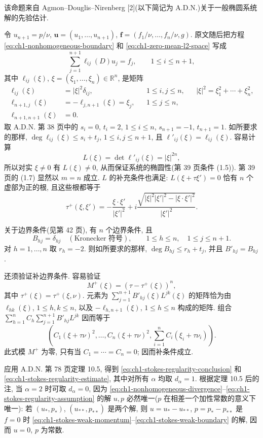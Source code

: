 \begin{Proof}
该命题来自 Agmon--Douglis--Nirenberg [2](以下简记为 A.D.N.)关于一般椭圆系统解的先验估计.

令 $u_{n+1}=p/\nu$, $\boldsymbol u=(u_1,\ldots,u_{n+1})$, $\boldsymbol f=(f_1/\nu,\ldots,f_n/\nu,g)$. 原文随后把方程 \eqref{eq:ch1-nonhomogeneous-boundary} 和 \eqref{eq:ch1-zero-mean-l2-space} 写成
\begin{equation}
\sum_{j=1}^{n+1}\ell_{ij}(D)u_j=f_j,
\qquad 1\leq i\leq n+1,
\label{eq:ch1-adn-system}
\end{equation}
其中 $\ell_{ij}(\xi)$, $\xi=(\xi_1,\ldots,\xi_n)\in\mathbb R^n$, 是矩阵
\begin{equation}
\begin{aligned}
\ell_{ij}(\xi)&=|\xi|^2\delta_{ij},
&&1\leq i,j\leq n,
&&|\xi|^2=\xi_1^2+\cdots+\xi_n^2,\\
\ell_{n+1,j}(\xi)&=-\ell_{j,n+1}(\xi)=\xi_j,
&&1\leq j\leq n,\\
\ell_{n+1,n+1}(\xi)&=0.
\end{aligned}
\label{eq:ch1-adn-symbol-matrix}
\end{equation}
取 A.D.N. 第 38 页中的 $s_i=0$, $t_i=2$, $1\leq i\leq n$, $s_{n+1}=-1$, $t_{n+1}=1$. 如所要求的那样, $\deg\ell_{ij}(\xi)\leq s_i+t_j$, $1\leq i,j\leq n+1$, 且 $\ell'_{ij}(\xi)=\ell_{ij}(\xi)$. 容易计算
\[
L(\xi)=\det\ell'_{ij}(\xi)=|\xi|^{2n},
\]
所以对实 $\xi\neq0$ 有 $L(\xi)\neq0$, 从而保证系统的椭圆性(第 39 页条件 (1.5)). 第 39 页的 (1.7) 显然以 $m=n$ 成立. $L$ 的补充条件也满足: $L(\xi+\tau\xi')=0$ 恰有 $n$ 个虚部为正的根, 且这些根都等于
\[
\tau^+(\xi,\xi')=
-\frac{\xi\cdot\xi'}{|\xi'|^2}
+i\frac{\sqrt{|\xi|^2|\xi'|^2-|\xi\cdot\xi'|^2}}{|\xi'|^2}.
\]

关于边界条件(见第 42 页), 有 $n$ 个边界条件, 且
\[
B_{hj}=\delta_{hj}\quad(\text{Kronecker 符号}),
\qquad1\leq h\leq n,\quad1\leq j\leq n+1.
\]
对 $h=1,\ldots,n$ 取 $r_h=-2$. 则如所要求的那样, $\deg B_{hj}\leq r_h+t_j$, 并且 $B'_{hj}=B_{hj}$.

还须验证补边界条件. 容易验证
\[
M^+(\xi)=(\tau-\tau^+(\xi))^n,
\]
其中 $\tau^+(\xi)=\tau^+(\xi,\nu)$. 元素为
$\sum_{j=1}^{n+1}B'_{hj}(\xi)L^{jk}(\xi)$ 的矩阵恰为由
$\ell_{hk}(\xi)$, $1\leq h,k\leq n$, 以及
$-\ell_{h,n+1}(\xi)$, $1\leq h\leq n$ 构成的矩阵. 组合
$\sum_{h=1}^n C_h\sum_{j=1}^{n+1}B'_{hj}L^{jk}$ 因而等于
\[
\left(
C_1(\xi+\tau\nu)^2,\ldots,
C_n(\xi+\tau\nu)^2,
\sum_{i=1}^nC_i(\xi_i+\tau\nu_i)
\right).
\]
此式模 $M^+$ 为零, 只有当 $C_1=\cdots=C_n=0$; 因而补条件成立.

应用 A.D.N. 第 78 页定理 10.5, 得到 \eqref{eq:ch1-stokes-regularity-conclusion} 和 \eqref{eq:ch1-stokes-regularity-estimate}, 其中对所有 $\alpha$ 均取 $d_\alpha=1$. 根据定理 10.5 后的注, 当 $\alpha=2$ 时可取 $d_\alpha=0$, 因为 \eqref{eq:ch1-nonhomogeneous-divergence}--\eqref{eq:ch1-stokes-regularity-assumption} 的解 $u,p$ 必然唯一($p$ 在相差一个加性常数的意义下唯一): 若 $(u_*,p_*)$, $(u_{**},p_{**})$ 是两个解, 则 $u=u_*-u_{**}$, $p=p_*-p_{**}$ 是 $f=0$ 时 \eqref{eq:ch1-stokes-weak-momentum}--\eqref{eq:ch1-stokes-weak-boundary} 的解, 因而 $u=0$, $p$ 为常数.
\end{Proof}

